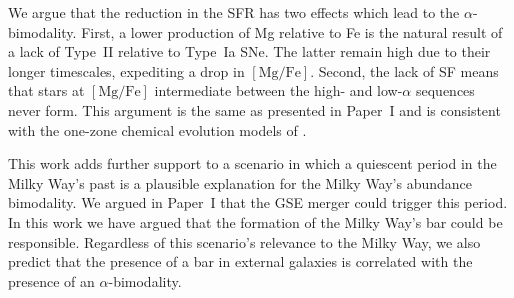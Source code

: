 \documentclass[twocolumn,linenumbers]{aastex631}
\newcommand{\MgFe}{\ensuremath{[\textrm{Mg}/\textrm{Fe}]}}
\begin{document}
We argue that the reduction in the SFR has two effects which lead to the $\alpha$-bimodality. First, a lower production of Mg relative to Fe is the natural result of a lack of Type~II relative to Type~Ia SNe. The latter remain high due to their longer timescales, expediting a drop in \MgFe{}. Second, the lack of SF means that stars at \MgFe{} intermediate between the high- and low-$\alpha$ sequences never form. This argument is the same as presented in Paper~I and is consistent with the one-zone chemical evolution models of \citet{2020MNRAS.498.1364J}. 

This work adds further support to a scenario in which a quiescent period in the Milky Way's past is a plausible explanation for the Milky Way's abundance bimodality. We argued in Paper~I that the GSE merger could trigger this period. In this work we have argued that the formation of the Milky Way's bar could be responsible. Regardless of this scenario's relevance to the Milky Way, we also predict that the presence of a bar in external galaxies is correlated with the presence of an $\alpha$-bimodality.
\end{document}
